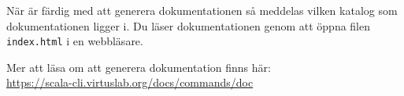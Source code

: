 När  är färdig med att generera dokumentationen så meddelas vilken katalog som dokumentationen ligger i. Du läser dokumentationen genom att öppna filen \texttt{index.html} i en webbläsare.

Mer att läsa om att generera dokumentation finns här: \\
\url{https://scala-cli.virtuslab.org/docs/commands/doc}







